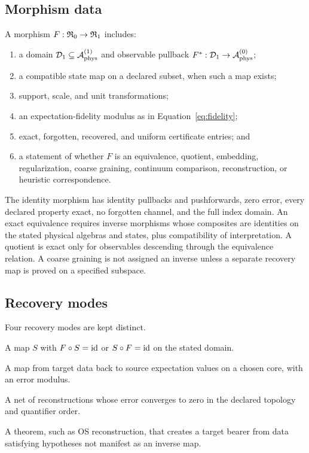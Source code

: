 \subsection{Morphism data}

A morphism $F:\mathfrak R_0\to\mathfrak R_1$ includes:
\begin{enumerate}[label=(\roman*),itemsep=2pt]
 \item a domain $\mathcal D_1\subseteq\mathcal A_{\mathrm{phys}}^{(1)}$ and observable pullback
 $F^*: \mathcal D_1\to\mathcal A_{\mathrm{phys}}^{(0)}$;
 \item a compatible state map on a declared subset, when such a map exists;
 \item support, scale, and unit transformations;
 \item an expectation-fidelity modulus as in Equation~\eqref{eq:fidelity};
 \item exact, forgotten, recovered, and uniform certificate entries; and
 \item a statement of whether $F$ is an equivalence, quotient, embedding,
 regularization, coarse graining, continuum comparison, reconstruction, or
 heuristic correspondence.
\end{enumerate}

The identity morphism has identity pullbacks and pushforwards, zero error,
every declared property exact, no forgotten channel, and the full index
domain.  An exact equivalence requires inverse morphisms whose composites are
identities on the stated physical algebras and states, plus compatibility of
interpretation.  A quotient is exact only for observables descending through
the equivalence relation.  A coarse graining is not assigned an inverse unless
a separate recovery map is proved on a specified subspace.

\subsection{Recovery modes}

Four recovery modes are kept distinct.

\begin{description}[style=nextline,leftmargin=8mm]
 \item[Exact section.] A map $S$ with $F\circ S=\mathrm{id}$ or $S\circ F=\mathrm{id}$ on
 the stated domain.
 \item[Observable reconstruction.] A map from target data back to source
 expectation values on a chosen core, with an error modulus.
 \item[Asymptotic recovery.] A net of reconstructions whose error converges
 to zero in the declared topology and quantifier order.
 \item[External theorem.] A theorem, such as OS reconstruction, that creates
 a target bearer from data satisfying hypotheses not manifest as an inverse
 map.
\end{description}

